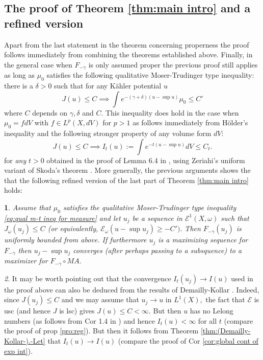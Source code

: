\documentclass[11pt,oneside,english]{amsart}
\numberwithin{equation}{section}
\numberwithin{figure}{section}
\theoremstyle{plain}
\newtheorem{thm}{\protect\theoremname}[section]
\theoremstyle{plain}
\theoremstyle{plain}
\theoremstyle{plain}
\theoremstyle{remark}
\newtheorem{rem}[thm]{\protect\remarkname}
\theoremstyle{definition}
\providecommand{\remarkname}{Remark}
\providecommand{\theoremname}{Theorem}
\begin{document}
\subsection{The proof of Theorem \ref{thm:main intro} and a refined version}

Apart from the last statement in the theorem concerning properness
the proof follows immediately from combining the theorems established
above. Finally, in the general case when $F_{-\gamma}$ is only assumed
proper the previous proof still applies as long as $\mu_{0}$ satisfies
the following qualitative Moser-Trudinger type inequality: there is
a $\delta>0$ such that for any Kähler potential $u$ 
\begin{equation}
J(u)\leq C\implies\int e^{-(\gamma+\delta)(u-\sup u)}\mu_{0}\leq C'\label{eq:qual m-t ineq for measure}
\end{equation}
where $C$ depends on $\gamma,\delta$ and $C.$ This inequality does
hold in the case when $\mu_{0}=fdV$ with $f\in L^{p}(X,dV)$ for
$p>1$ as follows immediately from Hölder's inequality and the following
stronger property of any volume form $dV:$ 
\begin{equation}
J(u)\leq C\implies I_{t}(u):=\int e^{-t(u-\sup u)}dV\leq C_{t}.\label{eq:pf main in proper case}
\end{equation}
 for\emph{ any }$t>0$ obtained in the proof of Lemma 6.4 in \cite{bbgz},
using Zeriahi's uniform variant of Skoda's theorem \cite{ze}. More
generally, the previous arguments shows the that the following refined
version of the last part of Theorem \ref{thm:main intro} holds:
\begin{thm}
\label{thm:refined conv towards opt} Assume that $\mu_{0}$ satisfies
the qualitative Moser-Trudinger type inequality \ref{eq:qual m-t ineq for measure}
and let $u_{j}$ be a sequence in $\mathcal{E}^{1}(X,\omega)$ such
that $J_{\omega}(u_{j})\leq C$ (or equivalently, $\mathcal{E}_{\omega}(u-\sup u_{j})\geq-C').$
Then $F_{-\gamma}(u_{j})$ is uniformly bounded from above. If furthermore
$u_{j}$ is a maximizing sequence for $F_{-\gamma}$ then $u_{j}-\sup u_{j}$
converges (after perhaps passing to a subsquence) to a maximizer for
$F_{-\gamma}\circ MA.$ \end{thm}
\begin{rem}
It may be worth pointing out that the convergence $I_{t}(u_{j})\rightarrow I(u)$
used in the proof above can also be deduced from the results of Demailly-Kollar
\cite{d-j}. Indeed, since $J(u_{j})\leq C$ and we may assume that
$u_{j}\rightarrow u$ in $L^{1}(X),$ the fact that $\mathcal{E}$
is usc (and hence $J$ is lsc) gives $J(u)\leq C<\infty.$ But then
$u$ has no Lelong numbers (as follows from Cor 1.4 in \cite{g-z2})
and hence $I_{t}(u)<\infty$ for all $t$ (compare the proof of prop
\ref{pro:reg}). But then it follows from Theorem \ref{thm:(Demailly-Kollar-).-Let}
that $I_{t}(u)\rightarrow I(u)$ (compare the proof of Cor \ref{cor:global cont of exp int}).
\end{rem}
\end{document}
